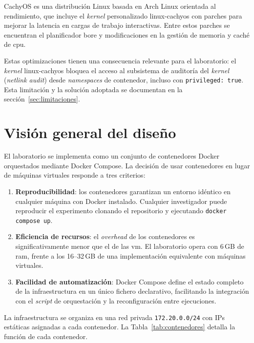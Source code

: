 \documentclass[../main.tex]{subfiles}
\begin{document}
CachyOS es una distribución Linux basada en Arch Linux orientada al rendimiento,
que incluye el \emph{kernel} personalizado linux-cachyos con parches para mejorar
la latencia en cargas de trabajo interactivas. Entre estos parches se encuentran
el planificador \gls{bore} y modificaciones en la gestión de memoria y
caché de \gls{cpu}.

Estas optimizaciones tienen una consecuencia relevante para el laboratorio: el
\emph{kernel} linux-cachyos bloquea el acceso al subsistema de auditoría del
\emph{kernel} (\emph{netlink audit}) desde \emph{namespaces} de contenedor, incluso
con \texttt{privileged:~true}. Esta limitación y la solución adoptada se documentan
en la sección~\ref{sec:limitaciones}.

\section{Visión general del diseño}

El laboratorio se implementa como un conjunto de contenedores Docker orquestados
mediante Docker Compose. La decisión de usar contenedores en lugar de máquinas
virtuales responde a tres criterios:

\begin{enumerate}
  \item \textbf{Reproducibilidad}: los contenedores garantizan un entorno idéntico
  en cualquier máquina con Docker instalado. Cualquier investigador puede reproducir
  el experimento clonando el repositorio y ejecutando \texttt{docker compose up}.

  \item \textbf{Eficiencia de recursos}: el \emph{overhead} de los contenedores
  es significativamente menor que el de las \gls{vm}. El laboratorio opera con
  6\,GB de \gls{ram}, frente a los 16--32\,GB de una implementación equivalente
  con máquinas virtuales.

  \item \textbf{Facilidad de automatización}: Docker Compose define el estado
  completo de la infraestructura en un único fichero declarativo, facilitando la
  integración con el \emph{script} de orquestación y la reconfiguración entre
  ejecuciones.
\end{enumerate}

La infraestructura se organiza en una red privada \texttt{172.20.0.0/24} con IPs
estáticas asignadas a cada contenedor. La Tabla~\ref{tab:contenedores} detalla la
función de cada contenedor.
\end{document}
